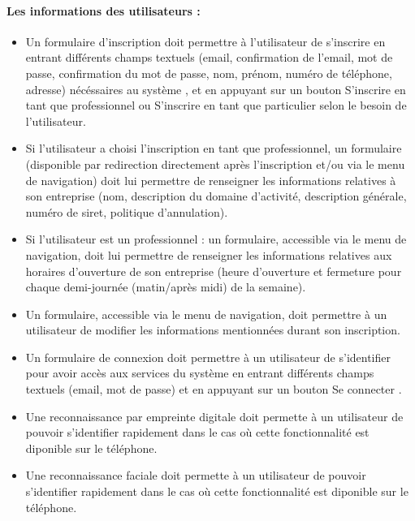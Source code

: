 \documentclass{article}
\begin{document}
\paragraph{Les informations des utilisateurs :}
\begin{itemize}
 \item Un formulaire d'inscription doit permettre à l'utilisateur de
   s'inscrire en entrant différents champs textuels (email,
   confirmation de l'email, mot de
   passe, confirmation du mot de passe, nom, prénom, numéro de téléphone, adresse) nécéssaires au
   système , et en appuyant sur
   un bouton \og S'inscrire en tant que professionnel\fg{} ou \og S'inscrire en tant que particulier\fg{} selon le besoin de l'utilisateur.

\item Si l'utilisateur a choisi l'inscription en tant que professionnel, un formulaire (disponible par redirection
directement après l'inscription et/ou via le menu de navigation) doit lui permettre de renseigner les informations relatives
à son entreprise (nom, description du domaine d'activité, description générale, numéro de siret, politique d'annulation).

\item Si l'utilisateur est un professionnel : un formulaire, accessible via le menu de navigation, doit lui permettre de renseigner les informations relatives aux
horaires d'ouverture de son entreprise (heure d'ouverture et fermeture pour chaque demi-journée (matin/après midi) de la semaine).

\item Un formulaire, accessible via le menu de navigation, doit permettre à un utilisateur de modifier les
  informations mentionnées durant son inscription.
\item Un formulaire de connexion doit permettre à un utilisateur de
  s'identifier pour avoir accès aux services du système en entrant
  différents champs textuels (email, mot de passe) et en appuyant sur
  un bouton \og Se connecter \fg{}.

\item Une reconnaissance par empreinte digitale doit permette à un
  utilisateur de pouvoir s'identifier rapidement dans le cas où cette
  fonctionnalité est diponible sur le téléphone.
\item Une reconnaissance faciale doit permette à un
  utilisateur de pouvoir s'identifier rapidement dans le cas où cette
  fonctionnalité est diponible sur le téléphone.
\end{itemize}
\end{document}
